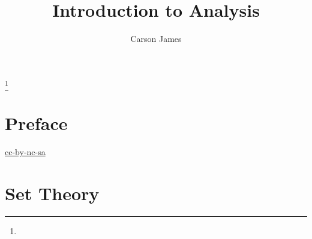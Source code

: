 \documentclass{book}
\begin{document}
	
	\frontmatter
	
	\title{Introduction to Analysis}
	
	
	\author{Carson James}
	\thanks{}
	
	\date{}
	
	\maketitle
	
	
	\setcounter{page}{4}
	
	\tableofcontents
	\printunsrtglossary[type=symbols,style=long,title={Notation}]
	
	
	\mainmatter
	
	\chapter*{Preface}

	\begin{flushleft}
		\href{https://creativecommons.org/licenses/by-nc-sa/4.0/legalcode.txt}{cc-by-nc-sa}
	\end{flushleft}

	\newpage
	
	
	
	
	
	
	
	
	
	
	
	
	
	\chapter{Set Theory}
	
\end{document}
